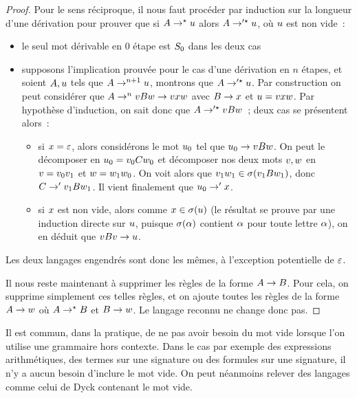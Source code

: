 \begin{proof}
  Pour le sens réciproque, il nous faut procéder par induction sur la longueur
  d'une dérivation pour prouver que si $A \to^{\mathord{\star}} u$ alors
  $A \to'^{\mathord{\star}} u$, où $u$ est non vide~:
  \begin{itemize}
  \item le seul mot dérivable en $0$ étape est $S_{0}$ dans les deux cas
  \item supposons l'implication prouvée pour le cas d'une dérivation en $n$
    étapes, et soient $A,u$ tels que $A \to^{n+1} u$, montrons
    que $A \to'^{\star} u$. Par construction on peut considérer que
    $A \to^n vBw \to vxw$ avec $B \to x$
    et $u = vxw$. Par hypothèse d'induction, on sait
    donc que $A \to'^{\mathord{\star}} vBw$~; deux cas se présentent
    alors~:
    \begin{itemize}
    \item si $x = \varepsilon$, alors considérons le mot $u_0$ tel que
      $u_0 \to vBw$. On peut le décomposer en
      $u_0 = v_0 Cw_0$ et décomposer nos deux mots
      $v,w$ en $v = v_0 v_1$ et
      $w = w_1w_0$.
      On voit alors que $v_1w_1 \in \sigma(v_1Bw_1)$,
      donc $C\to' v_1Bw_1$. Il vient finalement que
      $u_0 \to' x$.
    \item si $x$ est non vide, alors comme $x \in \sigma(u)$
      (le résultat se prouve par une induction directe sur $u$, puisque
      $\sigma(\alpha)$ contient $\alpha$ pour toute lettre $\alpha$), on en
      déduit que $vBv \to u$.
    \end{itemize}
  \end{itemize}

  Les deux langages engendrés sont donc les mêmes, à l'exception potentielle de
  $\varepsilon$.

  Il nous reste maintenant à supprimer les règles de la forme $A \to B$.
  Pour cela, on supprime simplement ces telles règles, et on ajoute toutes les
  règles de la forme $A \to w$ où $A \to^{\mathord{\star}} B$ et
  $B \to w$. Le langage reconnu ne change donc pas.
\end{proof}

\begin{remark}
  Il est commun, dans la pratique, de ne pas avoir besoin du mot vide lorsque
  l'on utilise une grammaire hors contexte. Dans le cas par exemple des
  expressions arithmétiques, des termes sur une signature ou des formules sur
  une signature, il n'y a aucun besoin d'inclure le mot vide. On peut néanmoins
  relever des langages comme celui de Dyck contenant le mot vide.
\end{remark}

